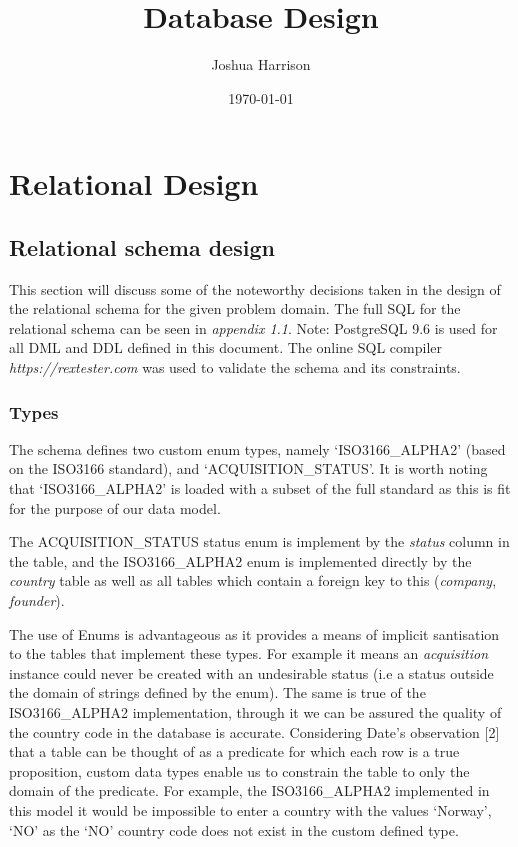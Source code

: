 \documentclass[12pt]{article}
\title{Database Design}
\author{Joshua Harrison}
\date{\today}
\begin{document}
\maketitle

\section{Relational Design}

\subsection{Relational schema design}
This section will discuss some of the noteworthy decisions taken in the design of the relational schema for the given problem domain.
The full SQL for the relational schema can be seen in \emph{appendix 1.1}. Note: PostgreSQL 9.6 is used for all DML and DDL defined in this document. The online SQL compiler \emph{https://rextester.com} was used to validate the schema and its constraints.

\subsubsection{Types}
The schema defines two custom enum types, namely  `ISO3166\_ALPHA2' (based on the ISO3166 standard), and `ACQUISITION\_STATUS'. It is worth noting that `ISO3166\_ALPHA2' is loaded with a subset of the full standard as this is fit for the purpose of our data model.

The ACQUISITION\_STATUS status enum is implement by the \emph{status} column in the  table, and the ISO3166\_ALPHA2 enum is implemented directly by the \emph{country} table as well as all tables which contain a foreign key to this (\emph{company}, \emph{founder}).

The use of Enums is advantageous as it provides a means of implicit santisation to the tables that implement these types. For example it means an \emph{acquisition} instance could never be created with an undesirable status (i.e a status outside the domain of strings defined by the enum). The same is true of the ISO3166\_ALPHA2 implementation, through it we can be assured the quality of the country code in the database is accurate. Considering Date's observation [2] that a table can be thought of as a predicate for which each row is a true proposition, custom data types enable us to constrain the table to only the domain of the predicate. For example, the ISO3166\_ALPHA2 implemented in this model it would be impossible to enter a country with the values `Norway', `NO' as the `NO' country code does not exist in the custom defined type.
\end{document}
